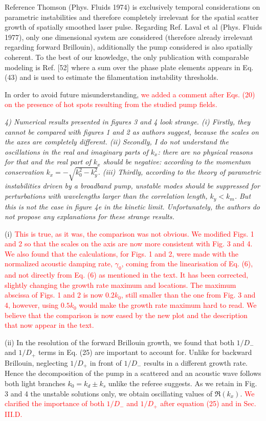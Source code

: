 \documentclass{article}
\def\tc{\textcolor{red}}
\begin{document}
Reference Thomson (Phys. Fluids 1974) is exclusively temporal considerations on parametric instabilities and therefore completely irrelevant for the spatial scatter growth  of spatially smoothed laser pulse. Regarding Ref. Laval et al (Phys. Fluids 1977), only one dimensional system are considered (therefore already irrelevant regarding forward Brillouin), additionally the pump considered is also spatially coherent.
To the best of our knowledge, the only publication with comparable modeling is Ref. [52] where a sum over the phase plate elements appears in  Eq. (43) and is used to estimate the filamentation  instability thresholds.

In order to avoid future misunderstanding, \tc{we added a comment after Eqs. (20) on the presence of hot spots resulting from the studied pump fields.}

\textit{
4) Numerical results presented in figures 3 and 4 look strange. (i) Firstly, they cannot be compared with figures 1 and 2 as authors suggest, because the scales on the axes are completely different. (ii) Secondly, I do not understand the oscillations in the real and imaginary parts of $k_x$: there are no physical reasons for that and the real part of $k_x$ should be negative: according to the momentum conservation $k_x = - \sqrt{k_0^2 - k_y^2}$. (iii) Thirdly, according to the theory of parametric instabilities driven by a broadband pump, unstable modes should be suppressed for perturbations with wavelengths larger than the correlation length, $k_y < k_m$. But this is not the case in figure 4e in the kinetic limit. Unfortunately, the authors do not propose any explanations for these strange results. }

(i) \tc{This is true, as it was, the comparison was not obvious.  We modified Figs. 1 and 2 so that the scales on the axis are now more consistent with Fig. 3  and 4. We also found that the calculations, for Figs. 1 and 2, were made with the normalized acoustic damping rate, $\gamma_0$, coming from the linearisation of Eq. (6), and not directly from Eq. (6) as mentioned in the text. It has been corrected, slightly changing the growth rate maximum and locations. 
The maximum abscissa of Figs. 1 and 2 is now $0.2k_0$, still smaller than the one from Fig. 3 and 4, however, using $0.5k_0$ would make the growth rate maximum hard to read. 
We believe that the comparison is now eased by the new plot and the description that now appear in the text. 
} 

(ii) 
In the resolution of the forward Brillouin growth, we found that both $1/D_-$ and $1/D_+$ terms  in Eq. (25) are important to account for. Unlike for backward Brillouin,  neglecting $1/D_+$ in front of $1/D_-$  results in a different growth rate.
Hence the decomposition of the pump in a scattered and an acoustic wave  follows both light branches $k_0=k_d \pm k_s$ unlike the referee suggests. As we retain in Fig. 3 and 4 the unstable solutions only, we obtain  oscillating values of $\Re(k_x)$. \tc{We clarified the importance of both $1/D_-$ and $1/D_+$ after equation (25) and in Sec. III.D.}
\end{document}
